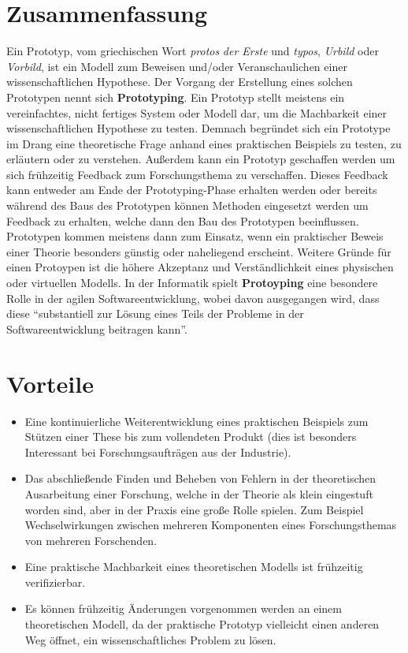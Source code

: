 \documentclass[a0,portrait]{a0poster}
\begin{document}
\begin{multicols}{2} %

\color{Black} %

\section*{Zusammenfassung}
Ein Prototyp, vom griechischen Wort \textit{protos} \textit{der Erste} und \textit{typos}, \textit{Urbild} oder \textit{Vorbild}, ist ein Modell zum Beweisen und/oder Veranschaulichen einer wissenschaftlichen Hypothese. Der Vorgang der Erstellung eines solchen Prototypen nennt sich \textbf{Prototyping}. Ein Prototyp stellt meistens ein vereinfachtes, nicht fertiges System oder Modell dar\cite[Folie 6]{PROTOTYPE}, um die Machbarkeit einer wissenschaftlichen Hypothese zu testen. Demnach begründet sich ein Prototype im Drang eine theoretische Frage anhand eines praktischen Beispiels zu testen, zu erläutern oder zu verstehen. Außerdem kann ein Prototyp geschaffen werden um sich frühzeitig Feedback zum Forschungsthema zu verschaffen. Dieses Feedback kann entweder am Ende der Prototyping-Phase erhalten werden oder bereits während des Baus des Prototypen können Methoden eingesetzt werden um Feedback zu erhalten, welche dann den Bau des Prototypen beeinflussen. Prototypen kommen meistens dann zum Einsatz, wenn ein praktischer Beweis einer Theorie besonders günstig oder naheliegend erscheint. Weitere Gründe für einen Protoypen ist die höhere Akzeptanz und Verständlichkeit eines physischen oder virtuellen Modells. In der Informatik spielt \textbf{Protoyping} eine besondere Rolle in der agilen Softwareentwicklung, wobei davon ausgegangen wird, dass diese ``substantiell zur Lösung eines Teils der Probleme in der Softwareentwicklung beitragen kann''\cite{POMBERGER}.

\section*{Vorteile}
\begin{itemize}
    \item Eine kontinuierliche Weiterentwicklung eines praktischen Beispiels zum Stützen einer These bis zum vollendeten Produkt (dies ist besonders Interessant bei Forschungsaufträgen aus der Industrie).
    \item Das abschließende Finden und Beheben von Fehlern in der theoretischen Ausarbeitung einer Forschung, welche in der Theorie als klein eingestuft worden sind, aber in der Praxis eine große Rolle spielen. Zum Beispiel Wechselwirkungen zwischen mehreren Komponenten eines Forschungsthemas von mehreren Forschenden.
    \item Eine praktische Machbarkeit eines theoretischen Modells ist frühzeitig verifizierbar.
    \item Es können frühzeitig Änderungen vorgenommen werden an einem theoretischen Modell, da der praktische Prototyp vielleicht einen anderen Weg öffnet, ein wissenschaftliches Problem zu lösen.
\end{itemize}


\end{multicols}
\end{document}
